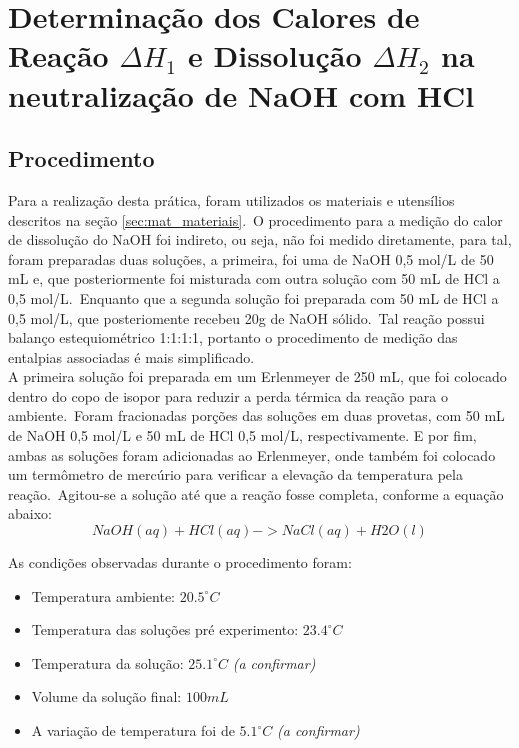 \section[Parte Experimental]{Determinação dos Calores de Reação  $\Delta{H_{1}}$ e Dissolução $\Delta{H_{2}}$ na neutralização de NaOH com HCl}\label{sec:parte_experimental}
    \subsection{Procedimento}\label{sec:procedimento}

        \indent Para a realização desta prática, foram utilizados os materiais e utensílios descritos na seção \ref{sec:mat_materiais}.\ O procedimento para a medição do calor de dissolução do NaOH foi indireto, ou seja, não foi medido diretamente, para tal, foram preparadas duas soluções, a primeira, foi uma de NaOH 0,5 mol/L de 50 mL e, que posteriormente foi misturada com outra solução com 50 mL de HCl a 0,5 mol/L.\ Enquanto que a segunda solução foi preparada com 50 mL de HCl a 0,5 mol/L, que posteriomente recebeu 20g de NaOH sólido.\ Tal reação possui balanço estequiométrico 1:1:1:1, portanto o procedimento de medição das entalpias associadas é mais simplificado.\\
        
        \indent A primeira solução foi preparada em um Erlenmeyer de 250 mL, que foi colocado dentro do copo de isopor para reduzir a perda térmica da reação para o ambiente.\ Foram fracionadas porções das soluções em duas provetas, com 50 mL de NaOH 0,5 mol/L e 50 mL de HCl 0,5 mol/L, respectivamente. E por fim, ambas as soluções foram adicionadas ao Erlenmeyer, onde também foi colocado um termômetro de mercúrio para verificar a elevação da temperatura pela reação.\ Agitou-se a solução até que a reação fosse completa, conforme a equação abaixo:
        \begin{equation}
            {NaOH(aq) + HCl(aq) -> NaCl(aq) + H2O(l)}
            \label{eq:equação_principal_aquosa}
        \end{equation}
    
    	\indent As condições observadas durante o procedimento foram:
    	\begin{itemize}
    		\item Temperatura ambiente: $20.5^{\circ}C$ 
    		\item Temperatura das soluções pré experimento:  $23.4^{\circ}C$
    		\item Temperatura da solução: $25.1^{\circ}C$ \textit{(a confirmar)}
            \item Volume da solução final: $100 mL$
            \item A variação de temperatura foi de ${5.1}^{\circ}C$ \textit{(a confirmar)}
    	\end{itemize}

